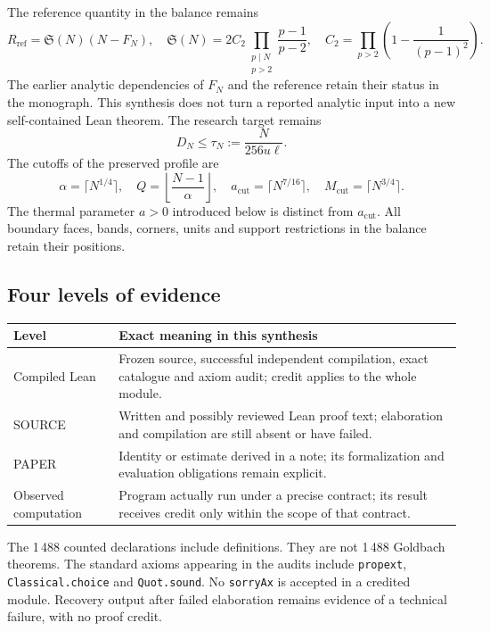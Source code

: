 \documentclass[11pt,a4paper]{article}
\theoremstyle{remark}
\newcommand{\Sing}{\mathfrak S}
\begin{document}
The reference quantity in the balance remains
\begin{equation}\label{eq:reference}
R_{\mathrm{ref}}=\Sing(N)(N-F_N),\quad
\Sing(N)=2C_2\prod_{\substack{p\mid N\\p>2}}\frac{p-1}{p-2},\quad
C_2=\prod_{p>2}\left(1-\frac1{(p-1)^2}\right).
\end{equation}
The earlier analytic dependencies of $F_N$ and the reference retain their
status in the monograph. This synthesis does not turn a reported analytic
input into a new self-contained Lean theorem. The research target remains
\begin{equation}\label{eq:target}
D_N\le \tau_N:=\frac{N}{256u\ell}.
\end{equation}
The cutoffs of the preserved profile are
\[
\alpha=\lceil N^{1/4}\rceil,\quad Q=\left\lfloor\frac{N-1}{\alpha}\right\rfloor,
\quad a_{\mathrm{cut}}=\lceil N^{7/16}\rceil,
\quad M_{\mathrm{cut}}=\lceil N^{3/4}\rceil.
\]
The thermal parameter $a>0$ introduced below is distinct from
$a_{\mathrm{cut}}$. All boundary faces, bands, corners, units and support
restrictions in the balance retain their positions.

\subsection*{Four levels of evidence}
\begin{tabularx}{\textwidth}{@{}p{29mm}Y@{}}
\toprule
Level & Exact meaning in this synthesis\\
\midrule
Compiled Lean & Frozen source, successful independent compilation, exact
catalogue and axiom audit; credit applies to the whole module.\\
SOURCE & Written and possibly reviewed Lean proof text; elaboration and
compilation are still absent or have failed.\\
PAPER & Identity or estimate derived in a note; its formalization and
evaluation obligations remain explicit.\\
Observed computation & Program actually run under a precise contract;
its result receives credit only within the scope of that contract.\\
\bottomrule
\end{tabularx}
The 1\,488 counted declarations include definitions. They are not 1\,488
Goldbach theorems. The standard axioms appearing in the audits include
\texttt{propext}, \texttt{Classical.choice} and \texttt{Quot.sound}.
No \texttt{sorryAx} is accepted in a credited module. Recovery output after
failed elaboration remains evidence of a technical failure, with no proof credit.
\end{document}
